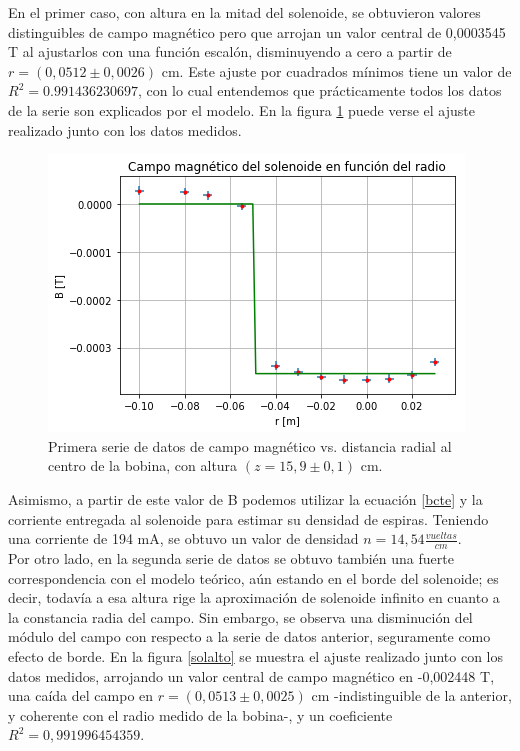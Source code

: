 \documentclass[12pt]{article}
\begin{document}
En el primer caso, con altura en la mitad del solenoide, se obtuvieron valores distinguibles de campo magnético pero que arrojan un valor central de 0,0003545 T al ajustarlos con una función escalón, disminuyendo a cero a partir de $r=(0,0512 \pm 0,0026)$ cm. Este ajuste por cuadrados mínimos tiene un valor de $R^2=0.991436230697$, con lo cual entendemos que prácticamente todos los datos de la serie son explicados por el modelo. En la figura \ref{solmedio} puede verse el ajuste realizado junto con los datos medidos.\\

\begin{figure}[H]
\centering
\includegraphics[scale=0.65]{solmedio.png}
\caption{Primera serie de datos de campo magnético vs. distancia radial al centro de la bobina, con altura $(z=15,9 \pm 0,1)$ cm.}
\label{solmedio}
\end{figure}

Asimismo, a partir de este valor de B podemos utilizar la ecuación \ref{bcte} y la corriente entregada al solenoide para estimar su densidad de espiras. Teniendo una corriente de 194 mA, se obtuvo un valor de densidad $n=14,54 \frac{vueltas}{cm}$.\\

Por otro lado, en la segunda serie de datos se obtuvo también una fuerte correspondencia con el modelo teórico, aún estando en el borde del solenoide; es decir, todavía a esa altura rige la aproximación de solenoide infinito en cuanto a la constancia radia del campo. Sin embargo, se observa una disminución del módulo del campo con respecto a la serie de datos anterior, seguramente como efecto de borde. En la figura \ref{solalto} se muestra el ajuste realizado junto con los datos medidos, arrojando un valor central de campo magnético en  -0,002448 T, una caída del campo en $r=(0,0513\pm 0,0025)$ cm -indistinguible de la anterior, y coherente con el radio medido de la bobina-, y un coeficiente $R^2=0,991996454359$. \\
\end{document}

